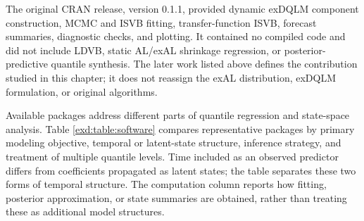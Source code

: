 The original CRAN release, version 0.1.1, provided dynamic exDQLM component
construction, MCMC and ISVB fitting, transfer-function ISVB, forecast summaries,
diagnostic checks, and plotting. It contained no compiled code and did not
include LDVB, static AL/exAL shrinkage regression, or posterior-predictive
quantile synthesis. The later work listed above defines the contribution studied
in this chapter; it does not reassign the exAL distribution, exDQLM formulation,
or original algorithms.

Available  packages \citep{exd-R} address different parts of
quantile regression and state-space analysis. Table \ref{exd:table:software}
compares representative packages by primary modeling objective, temporal or
latent-state structure, inference strategy, and treatment of multiple quantile
levels.
Time included as an observed predictor differs from coefficients propagated as
latent states; the table separates these two forms of temporal structure.
The computation column reports how fitting, posterior approximation, or state summaries are obtained, rather than treating these as additional model structures.
